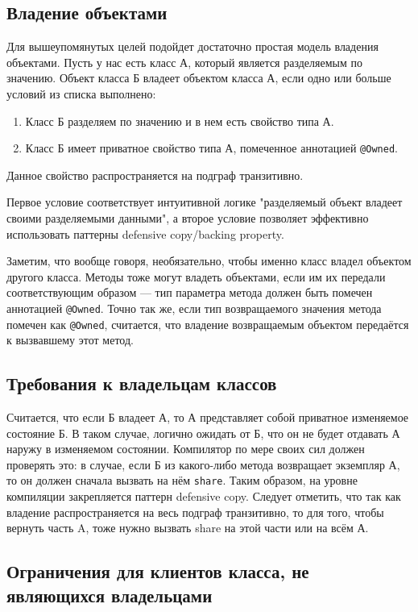 \documentclass[specification,annotation,times]{itmo-student-thesis}
\begin{document}
\subsection{Владение объектами}

Для вышеупомянутых целей подойдет достаточно простая модель владения объектами. Пусть у нас есть класс А, который является разделяемым по значению.
Объект класса Б владеет объектом класса А, если одно или больше условий из списка выполнено:

\begin{enumerate}
	\item Класс Б разделяем по значению и в нем есть свойство типа А.
	\item Класс Б имеет приватное свойство типа А, помеченное аннотацией \texttt{@Owned}.
\end{enumerate}

Данное свойство распространяется на подграф транзитивно.

Первое условие соответствует интуитивной логике "разделяемый объект владеет своими разделяемыми данными", а второе условие позволяет эффективно использовать паттерны defensive copy/backing property.

Заметим, что вообще говоря, необязательно, чтобы именно класс владел объектом другого класса.
Методы тоже могут владеть объектами, если им их передали соответствующим образом --- тип параметра метода должен быть помечен аннотацией \texttt{@Owned}.
Точно так же, если тип возвращаемого значения метода помечен как \texttt{@Owned}, считается, что владение возвращаемым объектом передаётся к вызвавшему этот метод.

\subsection{Требования к владельцам классов}

Считается, что если Б владеет А, то А представляет собой приватное изменяемое состояние Б.
В таком случае, логично ожидать от Б, что он не будет отдавать А наружу в изменяемом состоянии.
Компилятор по мере своих сил должен проверять это: в случае, если Б из какого-либо метода возвращает экземпляр А, то он должен сначала вызвать на нём \texttt{share}.
Таким образом, на уровне компиляции закрепляется паттерн defensive copy.
Следует отметить, что так как владение распространяется на весь подграф транзитивно, то для того, чтобы вернуть часть A, тоже нужно вызвать share на этой части или на всём А.

\subsection{Ограничения для клиентов класса, не являющихся владельцами}
\end{document}

